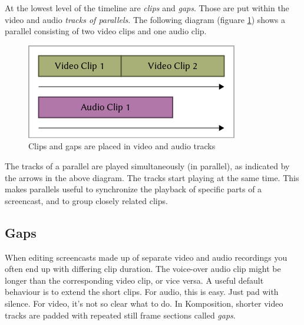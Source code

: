 At the lowest level of the timeline are \textit{clips} and \textit{gaps}. Those are put within the video and audio \textit{tracks of parallels}. The following diagram (figuare \ref{fig:case1_1}) shows a parallel consisting of two video clips and one audio clip.
\begin{figure}[htbp]
 \centering
 \includegraphics[width=.95\linewidth]{./pics/case1_1.png}
 \caption{Clips and gaps are placed in video and audio tracks}
 \label{fig:case1_1}
\end{figure}
The tracks of a parallel are played simultaneously (in parallel), as indicated by the arrows in the above diagram. The tracks start playing at the same time. This makes parallels useful to synchronize the playback of specific parts of a screencast, and to group closely related clips.

\subsection{Gaps}
When editing screencasts made up of separate video and audio recordings you often end up with differing clip duration. The voice-over audio clip might be longer than the corresponding video clip, or vice versa. A useful default behaviour is to extend the short clips. For audio, this is easy. Just pad with silence. For video, it's not so clear what to do. In Komposition, shorter video tracks are padded with repeated still frame sections called \textit{gaps}.


